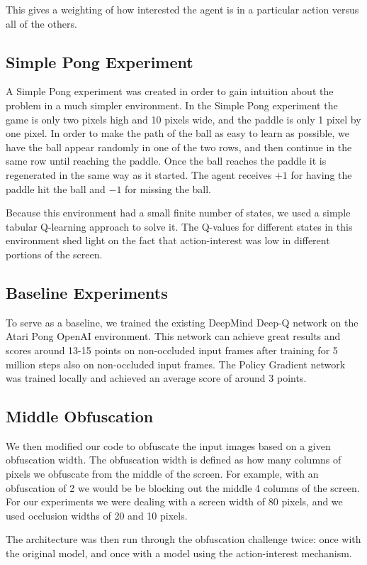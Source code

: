 \documentclass{article}
\begin{document}
This gives a weighting of how interested the agent is in a particular action versus all of the others. 

\subsection{Simple Pong Experiment}

A Simple Pong experiment was created in order to gain intuition about the problem in a much simpler environment.
In the Simple Pong experiment the game is only two pixels high and 10 pixels wide, and the paddle is only 1 pixel
by one pixel. In order to make the path of the ball as easy to learn as possible, we have the ball appear randomly in 
one of the two rows, and then continue in the same row until reaching the paddle. Once the ball reaches the paddle it is
regenerated in the same way as it started. The agent receives $+1$ for having the paddle hit the ball and $-1$ for missing the
ball.

Because this environment had a small finite number of states, we used a simple tabular Q-learning approach to solve it. The Q-values
for different states in this environment shed light on the fact that action-interest was low in different portions of the screen. 

\subsection{Baseline Experiments}
To serve as a baseline, we trained the existing DeepMind Deep-Q network on the Atari Pong OpenAI environment. This network can 
achieve great results and scores around 13-15 points on non-occluded input frames after training for 5 million steps also on non-occluded input frames.
The Policy Gradient network was trained locally and achieved an average score of around 3 points.

\subsection{Middle Obfuscation}
We then modified our code to obfuscate the input images based on a given obfuscation width. The obfuscation width is defined as how many columns of pixels
we obfuscate from the middle of the screen. For example, with an obfuscation of 2 we would be be blocking out the middle 4 columns of the screen.
For our experiments we were dealing with a screen width of 80 pixels, and we used occlusion widths of 20 and 10 pixels.

The architecture was then run through the obfuscation challenge twice: once with the original model, and once with a model
using the action-interest mechanism.
\end{document}
